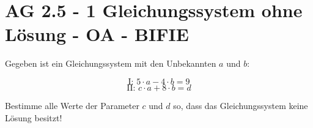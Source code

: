 \section{AG 2.5 - 1 Gleichungssystem ohne Lösung - OA - BIFIE}

\begin{beispiel}[AG 2.5]{1} %
			Gegeben ist ein Gleichungssystem mit den Unbekannten $a$ und $b$:
				
			
				\[\text{I: } 5 \cdot a - 4 \cdot b= 9 \]
					\[\text{II: } c \cdot a + 8\cdot b = d \]			
				
\leer


Bestimme alle Werte der Parameter $c$ und $d$ so, dass das Gleichungssystem keine Lösung besitzt!

\end{beispiel}